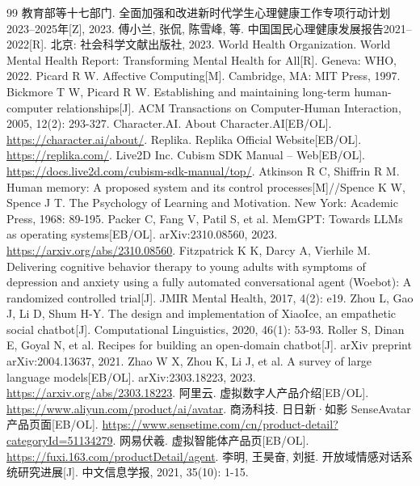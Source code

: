 \documentclass{base}
\begin{document}
\clearpage
\begin{thebibliography}{99}
 教育部等十七部门. 全面加强和改进新时代学生心理健康工作专项行动计划2023--2025年[Z], 2023.
 傅小兰, 张侃, 陈雪峰, 等. 中国国民心理健康发展报告2021--2022[R]. 北京: 社会科学文献出版社, 2023.
 World Health Organization. World Mental Health Report: Transforming Mental Health for All[R]. Geneva: WHO, 2022.
 Picard R W. Affective Computing[M]. Cambridge, MA: MIT Press, 1997.
 Bickmore T W, Picard R W. Establishing and maintaining long-term human-computer relationships[J]. ACM Transactions on Computer-Human Interaction, 2005, 12(2): 293-327.
 Character.AI. About Character.AI[EB/OL]. \url{https://character.ai/about/}.
 Replika. Replika Official Website[EB/OL]. \url{https://replika.com/}.
 Live2D Inc. Cubism SDK Manual -- Web[EB/OL]. \url{https://docs.live2d.com/cubism-sdk-manual/top/}.
 Atkinson R C, Shiffrin R M. Human memory: A proposed system and its control processes[M]//Spence K W, Spence J T. The Psychology of Learning and Motivation. New York: Academic Press, 1968: 89-195.
 Packer C, Fang V, Patil S, et al. MemGPT: Towards LLMs as operating systems[EB/OL]. arXiv:2310.08560, 2023. \url{https://arxiv.org/abs/2310.08560}.
 Fitzpatrick K K, Darcy A, Vierhile M. Delivering cognitive behavior therapy to young adults with symptoms of depression and anxiety using a fully automated conversational agent (Woebot): A randomized controlled trial[J]. JMIR Mental Health, 2017, 4(2): e19.
 Zhou L, Gao J, Li D, Shum H-Y. The design and implementation of XiaoIce, an empathetic social chatbot[J]. Computational Linguistics, 2020, 46(1): 53-93.
 Roller S, Dinan E, Goyal N, et al. Recipes for building an open-domain chatbot[J]. arXiv preprint arXiv:2004.13637, 2021.
 Zhao W X, Zhou K, Li J, et al. A survey of large language models[EB/OL]. arXiv:2303.18223, 2023. \url{https://arxiv.org/abs/2303.18223}.
 阿里云. 虚拟数字人产品介绍[EB/OL]. \url{https://www.aliyun.com/product/ai/avatar}.
 商汤科技. 日日新·如影 SenseAvatar 产品页面[EB/OL]. \url{https://www.sensetime.com/cn/product-detail?categoryId=51134279}.
 网易伏羲. 虚拟智能体产品页[EB/OL]. \url{https://fuxi.163.com/productDetail/agent}.
 李明, 王昊奋, 刘挺. 开放域情感对话系统研究进展[J]. 中文信息学报, 2021, 35(10): 1-15.

\end{thebibliography}
\end{document}

